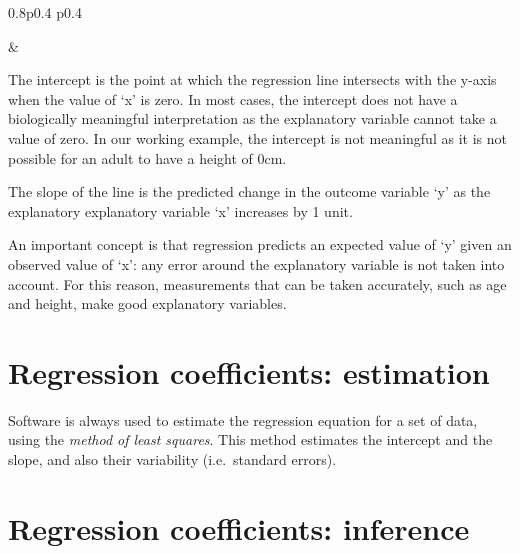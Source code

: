\documentclass[
]{memoir}
\begin{document}
\begin{table}[ht]
\begin{centerbox}
\begin{threeparttable}
\begin{tabularx}{0.8\textwidth}{p{} p{}}
\hhline{}

 &
 \tabularnewline[-0.5pt]


\end{tabularx}
\end{threeparttable}\par\end{centerbox}

\end{table}
 

The intercept is the point at which the regression line intersects with the y-axis when the value of `x' is zero. In most cases, the intercept does not have a biologically meaningful interpretation as the explanatory variable cannot take a value of zero. In our working example, the intercept is not meaningful as it is not possible for an adult to have a height of 0cm.

The slope of the line is the predicted change in the outcome variable `y' as the explanatory explanatory variable `x' increases by 1 unit.

An important concept is that regression predicts an expected value of `y' given an observed value of `x': any error around the explanatory variable is not taken into account. For this reason, measurements that can be taken accurately, such as age and height, make good explanatory variables.

\hypertarget{regression-coefficients-estimation}{%
\section{Regression coefficients: estimation}\label{regression-coefficients-estimation}}

Software is always used to estimate the regression equation for a set of data, using the \emph{method of least squares}. This method estimates the intercept and the slope, and also their variability (i.e.~standard errors).

\hypertarget{regression-coefficients-inference}{%
\section{Regression coefficients: inference}\label{regression-coefficients-inference}}
\end{document}

